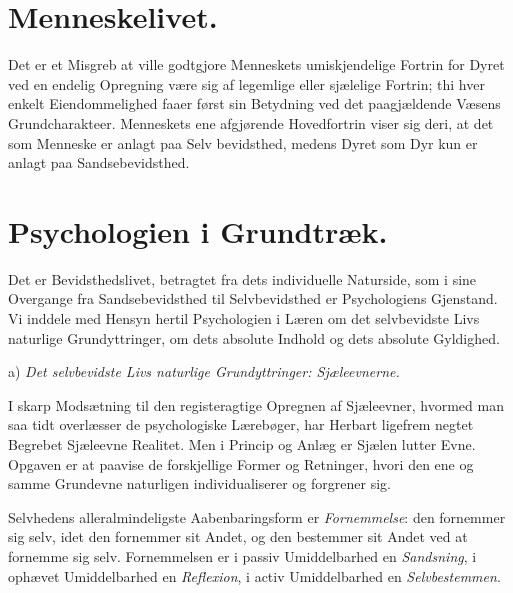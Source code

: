 \documentclass[11pt]{book}
\newcommand{\opage}[1]{\marginnote{\footnotesize\textit{[#1]}}}
\begin{document}
\chapter*{Menneskelivet.}

Det er et Misgreb at ville godtgjore Menneskets umiskjendelige
Fortrin for Dyret ved en endelig Opregning være sig af legemlige eller
sjælelige Fortrin; thi hver enkelt Eiendommelighed faaer først sin
Betydning ved det paagjældende Væsens Grundcharakteer. Menneskets ene
afgjørende Hovedfortrin viser sig deri, at det som Menneske er anlagt
paa Selv\-%
\opage{274} \setcounter{footnote}{0}%
bevidsthed, medens Dyret som Dyr kun er anlagt paa
Sandsebevidsthed.

\chapter*{Psychologien i Grundtræk.}

Det er Bevidsthedslivet, betragtet fra dets individuelle Naturside,
som i sine Overgange fra Sandsebevidsthed til Selvbevidsthed er
Psychologiens Gjenstand. Vi inddele med Hensyn hertil Psychologien i
Læren om det selvbevidste Livs naturlige Grundyttringer, om dets
absolute Indhold og dets absolute Gyldighed.

a) \emph{Det selvbevidste Livs naturlige Grundyttringer:
Sjæleevnerne.}

I skarp Modsætning til den registeragtige Opregnen af Sjæleevner,
hvormed man saa tidt overlæsser de psychologiske Lærebøger, har
Herbart ligefrem negtet Begrebet Sjæleevne Realitet. Men i Princip og
Anlæg er Sjælen lutter Evne. Opgaven er at paavise de forskjellige
Former og Retninger, hvori den ene og samme Grundevne naturligen
individualiserer og forgrener sig.

Selvhedens alleralmindeligste Aabenbaringsform er
\emph{Fornemmelse}: den fornemmer sig selv, idet den fornemmer sit
Andet, og den bestemmer sit Andet ved at fornemme sig selv.
Fornemmelsen er i passiv Umiddelbarhed en \emph{Sandsning}, i ophævet
Umiddelbarhed en \emph{Reflexion}, i activ Umiddelbarhed en
\emph{Selvbestemmen}.
\end{document}
